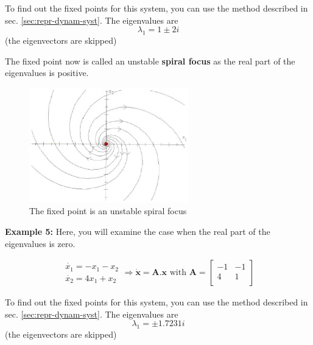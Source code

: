 To find out the fixed points for this system, you can use the method
described in sec. \ref{sec:repr-dynam-syst}. The eigenvalues are
\begin{equation}
  \label{eq:1072}
  \lambda_1 = 1 \pm 2i
\end{equation}
(the eigenvectors are skipped)

The fixed point now is called an unstable {\bf spiral focus} as the
real part of the eigenvalues is positive.
\begin{figure}[htb]
  \centerline{\includegraphics[height=5cm]{./images/unstable_spiral.eps}}
  \caption{The fixed point is an unstable spiral focus}\label{fig:unstable_spiral}
\end{figure}

{\bf Example 5:} Here, you will examine the case when the real part of
the eigenvalues is zero.

\begin{equation}
  \label{eq:1064}
  \begin{split}
    \begin{array}{c}
          \dot{x_1} = -x_1 - x_2 \\
    \dot{x_2} = 4x_1 + x_2
    \end{array}
\Rightarrow
\mathbf{\dot{x} = A.x}
\text{ with } \mathbf{A} = \left[
\begin{array}{cc}
  -1 & -1 \\
  4 & 1 \\
\end{array}
\right]
  \end{split}
\end{equation}

To find out the fixed points for this system, you can use the method
described in sec. \ref{sec:repr-dynam-syst}. The eigenvalues are
\begin{equation}
  \label{eq:1073}
  \lambda_1 = \pm 1.7231i
\end{equation}
(the eigenvectors are skipped)

